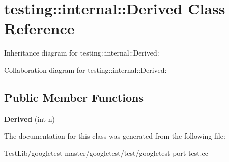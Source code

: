 \hypertarget{classtesting_1_1internal_1_1Derived}{}\section{testing\+:\+:internal\+:\+:Derived Class Reference}
\label{classtesting_1_1internal_1_1Derived}


Inheritance diagram for testing\+:\+:internal\+:\+:Derived\+:


Collaboration diagram for testing\+:\+:internal\+:\+:Derived\+:
\subsection*{Public Member Functions}
\begin{DoxyCompactItemize}
\item 
\mbox{\label{classtesting_1_1internal_1_1Derived_a05a8e8354c7c09a9f3728a96c96f1edd}} 
{\bfseries Derived} (int n)
\end{DoxyCompactItemize}


The documentation for this class was generated from the following file\+:\begin{DoxyCompactItemize}
\item 
Test\+Lib/googletest-\/master/googletest/test/googletest-\/port-\/test.\+cc\end{DoxyCompactItemize}
